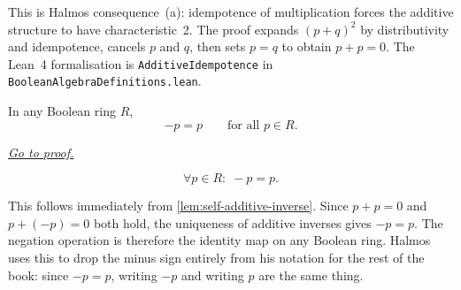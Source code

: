 \begin{remark*}[Interpretation]
This is Halmos consequence~(a): idempotence of multiplication
forces the additive structure to have characteristic~2.  The proof
expands $(p+q)^2$ by distributivity and idempotence, cancels $p$
and $q$, then sets $p = q$ to obtain $p + p = 0$.  The Lean~4
formalisation is \texttt{AdditiveIdempotence} in
\texttt{BooleanAlgebraDefinitions.lean}.
\end{remark*}


\begin{lemma}
\label{lem:self-negation}
In any Boolean ring $R$,
\[
-p = p \qquad \text{for all } p \in R.
\]

\smallskip
\noindent
\hyperref[prf:self-negation]{\textit{Go to proof.}}
\end{lemma}

\begin{remark*}
\[
\forall p \in R{:}\; -p = p.
\]
\end{remark*}

\begin{remark*}[Interpretation]
This follows immediately from \ref{lem:self-additive-inverse}.
Since $p + p = 0$ and $p + (-p) = 0$ both hold, the uniqueness of
additive inverses gives $-p = p$.  The negation operation is
therefore the identity map on any Boolean ring.  Halmos uses this
to drop the minus sign entirely from his notation for the rest of
the book: since $-p = p$, writing $-p$ and writing $p$ are the
same thing.
\end{remark*}